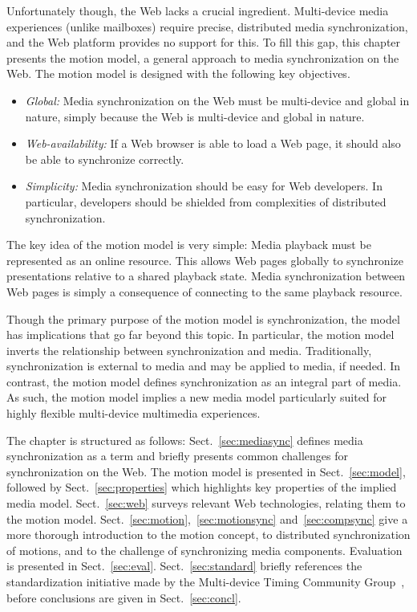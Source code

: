 Unfortunately though, the Web lacks a crucial ingredient. Multi-device media
experiences (unlike mailboxes) require precise, distributed media
synchronization, and the Web platform provides no support for this. To fill
this gap, this chapter presents the motion model, a general approach to
media synchronization on the Web. The motion model is designed with the
following key objectives.

\begin{itemize}
\item{\emph{Global:} Media synchronization on the Web must be multi-device 
and global in nature, simply because the Web is multi-device and global in nature.}
\item{\emph{Web-availability:} If a Web browser is able to load a Web page, 
it should also be able to synchronize correctly.}
\item{\emph{Simplicity:} Media synchronization should be easy for Web developers. 
In particular, developers should be shielded from complexities of distributed synchronization.}
\end{itemize}

The key idea of the motion model is very simple: Media playback must be
represented as an online resource. This allows Web pages globally to
synchronize presentations relative to a shared playback state. Media
synchronization between Web pages is simply a consequence of connecting to the
same playback resource.

Though the primary purpose of the motion model is synchronization, the model
has implications that go far beyond this topic. In particular, the motion
model inverts the relationship between synchronization and media.
Traditionally, synchronization is external to media and may be applied to
media, if needed. In contrast, the motion model defines synchronization as an
integral part of media. As such, the motion model implies a new media model
particularly suited for highly flexible multi-device multimedia experiences.

The chapter is structured as follows: Sect.~\ref{sec:mediasync} defines media
synchronization as a term and briefly presents common challenges for synchronization on the Web. The motion
model is presented in Sect.~\ref{sec:model}, followed by
Sect.~\ref{sec:properties} which highlights key properties of the implied
media model. Sect.~\ref{sec:web} surveys relevant Web technologies, relating
them to the motion model.
Sect.~\ref{sec:motion},~\ref{sec:motionsync} and~\ref{sec:compsync} give a more
thorough introduction to the motion concept, to distributed synchronization of
motions, and to the challenge of synchronizing media components. Evaluation is
presented in Sect.~\ref{sec:eval}. Sect.~\ref{sec:standard} briefly references
the standardization initiative made by the Multi-device Timing Community
Group~\cite{mtcg}, before conclusions are given in Sect.~\ref{sec:concl}.
